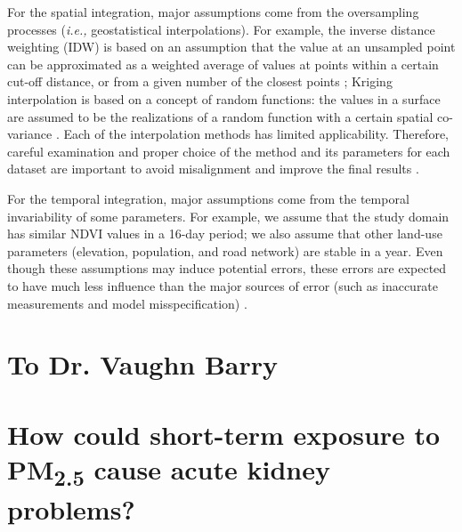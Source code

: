 \documentclass[11pt]{article}
\newcommand{\tsub}{\textsubscript}
\begin{document}
\begin{enumerate*}[{[a)]}]
{    \item For the spatial integration, major assumptions come from the oversampling processes (\textit{i.e.,} geostatistical interpolations). For example, the inverse distance weighting (IDW) is based on an assumption that the value at an unsampled point can be approximated as a weighted average of values at points within a certain cut-off distance, or from a given number of the closest points \citep{bartier1996multivariate}; Kriging interpolation is based on a concept of random functions: the values in a surface are assumed to be the realizations of a random function with a certain spatial co-variance \citep{oliver1990kriging}. Each of the interpolation methods has limited applicability. Therefore, careful examination and proper choice of the method and its parameters for each dataset are important to avoid misalignment and improve the final results \citep{mitas1999spatial}.
    
    For the temporal integration, major assumptions come from the temporal invariability of some parameters. For example, we assume that the study domain has similar NDVI values in a 16-day period; we also assume that other land-use parameters (elevation, population, and road network) are stable in a year. Even though these assumptions may induce potential errors, these errors are expected to have much less influence than the major sources of error (such as inaccurate measurements and model misspecification) \citep{xiao2017full}.
    }
\end{enumerate*}

\section*{To Dr. Vaughn Barry}
\setcounter{section}{0}

\section{How could short-term exposure to \texorpdfstring{PM\tsub{2.5}}{PM2.5} cause acute kidney problems?}
\end{document}
